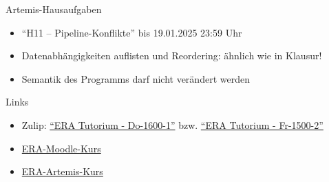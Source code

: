 \begin{frame}[c, fragile]{Artemis-Hausaufgaben}{}
	\begin{itemize}
		\item \enquote{H11 -- Pipeline-Konflikte} bis 19.01.2025 23:59 Uhr
		\item Datenabhängigkeiten auflisten und Reordering: ähnlich wie in Klausur!
		\item Semantik des Programms darf nicht verändert werden
	\end{itemize}
\end{frame}

\begin{frame}[c, fragile]{Links}{}
	\begin{itemize}
		\item Zulip: \href{https://zulip.in.tum.de/#narrow/stream/2661-ERA-Tutorium---Do-1600-1}{\enquote{ERA Tutorium - Do-1600-1}}
		      bzw. \href{https://zulip.in.tum.de/#narrow/stream/2675-ERA-Tutorium---Fr-1500-2 }{\enquote{ERA Tutorium - Fr-1500-2}}
		\item \href{https://www.moodle.tum.de/course/view.php?id=100633}{ERA-Moodle-Kurs}
		\item \href{https://artemis.in.tum.de/courses/401}{ERA-Artemis-Kurs}
	\end{itemize}
\end{frame}

\maketitle


